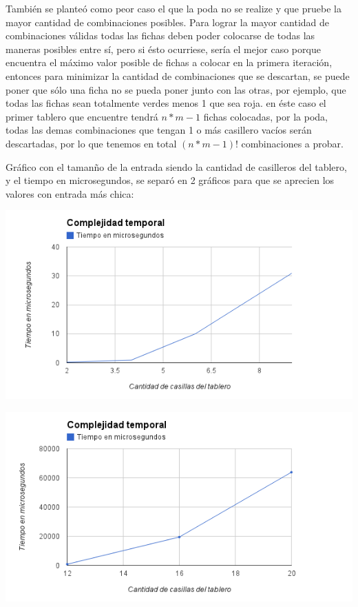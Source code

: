 Tambi\'en se plante\'o como peor caso el que la poda no se realize y que pruebe la mayor cantidad de combinaciones posibles. Para lograr la mayor cantidad de combinaciones v\'alidas todas las fichas deben poder colocarse de todas las maneras posibles entre s\'i, pero si \'esto ocurriese, ser\'ia el mejor caso porque encuentra el m\'aximo valor posible de fichas a colocar en la primera iteraci\'on, entonces para minimizar la cantidad de combinaciones que se descartan, se puede poner que s\'olo una ficha no se pueda poner junto con las otras,
por ejemplo, que todas las fichas sean totalmente verdes menos 1 que sea roja. en \'este caso el primer tablero que encuentre tendr\'a $n*m - 1$ fichas colocadas, por la poda, todas las demas combinaciones que tengan 1 o m\'as casillero vac\'ios ser\'an descartadas, por lo que tenemos en total $(n*m-1)!$ combinaciones a probar.

Gr\'afico con el taman\~no de la entrada siendo la cantidad de casilleros del tablero, y el tiempo en microsegundos, se separ\'o en 2 gr\'aficos para que se aprecien los valores con entrada m\'as chica:
\begin{center}
	\includegraphics[scale=0.70]{images/ej3_tiempo1.png}
\end{center}
\begin{center}
	\includegraphics[scale=0.70]{images/ej3_tiempo2.png}
\end{center}

